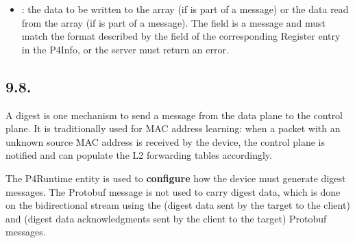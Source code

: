 \documentclass[11pt]{article}
\begin{document}
{\begin{itemize}
\item{}
: the data to be written to the array (if  is part of a
 message) or the data read from the array (if  is
part of a  message). The  field is a  message and
must match the format described by the  field of the corresponding
Register entry in the P4Info, or the server must return an 
error.%
\end{itemize}%

\subsection{9.8.\hspace*{0.5em}}\label{sec-digestentry}%

\noindent{}A digest is one mechanism to send a message from the data plane to the
control plane. It is traditionally used for MAC address learning: when a packet
with an unknown source MAC address is received by the device, the control plane
is notified and can populate the L2 forwarding tables accordingly.%

The  P4Runtime entity is used to \textbf{configure} how the device must
generate digest messages. The  Protobuf message is not used to
carry digest data, which is done on the  bidirectional stream
using the  (digest data sent by the target to the client) and
 (digest data acknowledgments sent by the client to the target)
Protobuf messages.%

}
\end{document}
